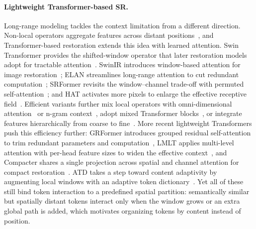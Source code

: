 \paragraph{Lightweight Transformer-based SR.}
Long-range modeling tackles the context limitation from a different direction.
Non-local operators aggregate features across distant positions~\cite{wang2018nonlocal},
and Transformer-based restoration extends this idea with learned attention.
Swin Transformer provides the shifted-window
operator that later restoration models adopt for tractable attention~\cite{liu2021swin}.
SwinIR introduces window-based attention for image restoration~\cite{liang2021swinir};
ELAN streamlines long-range attention to cut redundant computation~\cite{zhang2022elan};
SRFormer revisits the window--channel trade-off with permuted
self-attention~\cite{zhou2023srformer}; and HAT activates more pixels to enlarge the
effective receptive field~\cite{chen2023hat}. Efficient variants further mix local
operators with omni-dimensional attention~\cite{wang2023omnisr} or n-gram
context~\cite{choi2023ngswin}, adopt mixed Transformer
blocks~\cite{zheng2023emt}, or integrate features hierarchically from coarse to
fine~\cite{liu2022hpinet}. More recent lightweight
Transformers push this efficiency further: GRFormer introduces grouped residual
self-attention to trim redundant parameters and computation~\cite{li2024grformer},
LMLT applies multi-level attention with per-head feature sizes to widen the
effective context~\cite{kim2025lmlt}, and Compacter shares a single projection
across spatial and channel attention for compact restoration~\cite{wu2024compacter}.
ATD takes a step toward content adaptivity by augmenting local windows with an
adaptive token dictionary~\cite{zhang2024atd}. Yet all of these still bind token
interaction to a predefined spatial partition: semantically similar but spatially
distant tokens interact only when the window grows or an extra global path is
added, which motivates organizing tokens by content instead of position.

